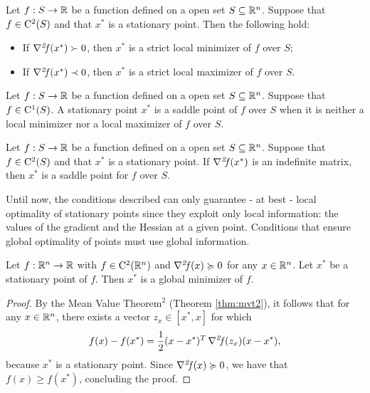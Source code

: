 \documentclass[10pt,a4paper]{article}
\begin{document}
\begin{theorem}\label{thm:suff_second_order_optimality}
	Let $f:S\to \mathbb{R}$ be a function defined on a open set $S\subseteq \mathbb{R}^n$. Suppose that $f\in\mathord{\mathrm{C^2}}(S)$ and that $x^*$ is a stationary point. Then the following hold:
	\begin{itemize}
		\item[(a)] If $\operatorname*{\mathit{\nabla^2 \!f}} (x^*)\succ 0$, then $x^*$ is a strict local minimizer of $f$ over $S$;
		\item[(b)] If  $\operatorname*{\mathit{\nabla^2 \!f}} (x^*)\prec 0$, then $x^*$ is a strict local maximizer of $f$ over $S$.
	\end{itemize}
\end{theorem}

\begin{definition}
	Let $f:S\to \mathbb{R}$ be a function defined on a open set $S\subseteq \mathbb{R}^n$. Suppose that $f\in \mathord{\mathrm{C^1}}(S)$. A stationary point $x^*$ is a saddle point of $f$ over $S$ when it is neither a local minimizer nor a local maximizer of $f$ over $S$.
\end{definition}

\begin{theorem}
	Let $f:S\to \mathbb{R}$ be a function defined on a open set $S\subseteq \mathbb{R}^n$. Suppose that $f\in\mathord{\mathrm{C^2}}(S)$ and that $x^*$ is a stationary point. If $\operatorname*{\mathit{\nabla^2 \!f}}(x^*)$ is an indefinite matrix, then $x^*$ is a saddle point for $f$ over $S$.
\end{theorem}
Until now, the conditions described can only guarantee - at best - local optimality of stationary points since they exploit only local information: the values of the gradient and the Hessian at a given point. Conditions that ensure global optimality of points must use global information.

\begin{theorem}
	Let $f:\mathbb{R}^n\to \mathbb{R}$ with $f\in\mathord{\mathrm{C^2}}(\mathbb{R}^n)$ and $\operatorname*{\mathit{\nabla^2 \!f}} (x)\succcurlyeq0$ for any $x\in \mathbb{R}^n$. Let $x^*$ be a stationary point of $f$. Then $x^*$ is a global minimizer of $f$. 
\end{theorem}
\begin{proof}
	By the Mean Value Theorem$^2$ (Theorem \ref{thm:mvt2}), it follows that for any $x\in\mathbb{R}^n$, there exists a vector $z_x\in[x^*,x]$ for which 
	\begin{equation*}
		f(x) - f(x^*) = \frac{1}{2}(x-x^*)^T\operatorname*{\mathit{\nabla^2 \!f}} (z_x)(x-x^*),
	\end{equation*}
because $x^*$ is a stationary point. Since $\operatorname*{\mathit{\nabla^2 \!f}} (x) \succcurlyeq 0$, we have that $f(x)\geq f(x^*)$, concluding the proof.
\end{proof}
\end{document}

